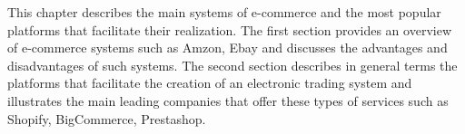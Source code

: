 This chapter describes the main systems of e-commerce and the most popular platforms that facilitate their realization.
The first section provides an overview of e-commerce systems such as Amzon, Ebay and discusses the advantages and disadvantages of such systems.
\newline
The second section describes in general terms the platforms that facilitate the creation of an electronic trading system and illustrates the main leading companies that offer these types of services such as Shopify, BigCommerce, Prestashop.